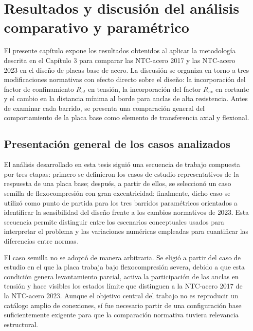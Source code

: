 \chapter{Resultados y discusión del análisis comparativo y paramétrico}

El presente capítulo expone los resultados obtenidos al aplicar la metodología descrita en el
Capítulo 3 para comparar las NTC-acero 2017 y las NTC-acero 2023 en el diseño de placas base de
acero. La discusión se organiza en torno a tres modificaciones normativas con efecto directo sobre
el diseño: la incorporación del factor de confinamiento $R_{et}$ en tensión, la incorporación del
factor $R_{ev}$ en cortante y el cambio en la distancia mínima al borde para anclas de alta
resistencia. Antes de examinar cada barrido, se presenta una comparación general del comportamiento
de la placa base como elemento de transferencia axial y flexional.

\section{Presentación general de los casos analizados}

El análisis desarrollado en esta tesis siguió una secuencia de trabajo compuesta por tres etapas:
primero se definieron los casos de estudio representativos de la respuesta de una placa base;
después, a partir de ellos, se seleccionó un caso semilla de flexocompresión con gran excentricidad;
finalmente, dicho caso se utilizó como punto de partida para los tres barridos paramétricos
orientados a identificar la sensibilidad del diseño frente a los cambios normativos de 2023. Esta
secuencia permite distinguir entre los escenarios conceptuales usados para interpretar el problema y
las variaciones numéricas empleadas para cuantificar las diferencias entre normas.

El caso semilla no se adoptó de manera arbitraria. Se eligió a partir del caso de estudio en el que
la placa trabaja bajo flexocompresión severa, debido a que esta condición genera levantamiento
parcial, activa la participación de las anclas en tensión y hace visibles los estados límite que
distinguen a la NTC-acero 2017 de la NTC-acero 2023. Aunque el objetivo central del trabajo no es
reproducir un catálogo amplio de conexiones, sí fue necesario partir de una configuración base
suficientemente exigente para que la comparación normativa tuviera relevancia estructural.

